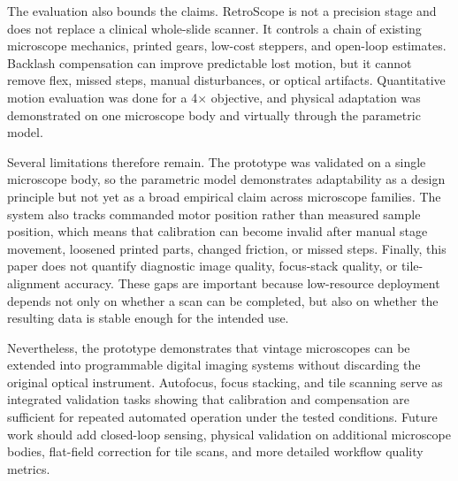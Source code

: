 \documentclass[runningheads]{llncs}
\begin{document}
The evaluation also bounds the claims. RetroScope is not a precision stage and does not replace a clinical whole-slide scanner. It controls a chain of existing microscope mechanics, printed gears, low-cost steppers, and open-loop estimates. Backlash compensation can improve predictable lost motion, but it cannot remove flex, missed steps, manual disturbances, or optical artifacts. Quantitative motion evaluation was done for a 4$\times$ objective, and physical adaptation was demonstrated on one microscope body and virtually through the parametric model.

Several limitations therefore remain. The prototype was validated on a single microscope body, so the parametric model demonstrates adaptability as a design principle but not yet as a broad empirical claim across microscope families. The system also tracks commanded motor position rather than measured sample position, which means that calibration can become invalid after manual stage movement, loosened printed parts, changed friction, or missed steps. Finally, this paper does not quantify diagnostic image quality, focus-stack quality, or tile-alignment accuracy. These gaps are important because low-resource deployment depends not only on whether a scan can be completed, but also on whether the resulting data is stable enough for the intended use.

Nevertheless, the prototype demonstrates that vintage microscopes can be extended into programmable digital imaging systems without discarding the original optical instrument. Autofocus, focus stacking, and tile scanning serve as integrated validation tasks showing that calibration and compensation are sufficient for repeated automated operation under the tested conditions. Future work should add closed-loop sensing, physical validation on additional microscope bodies, flat-field correction for tile scans, and more detailed workflow quality metrics.

\newpage
\end{document}
